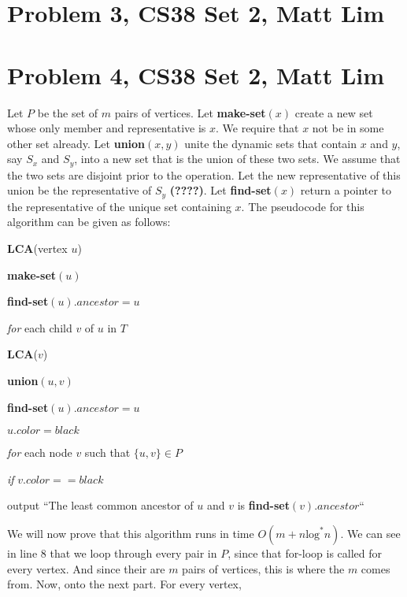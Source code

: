 \documentclass{article}
\begin{document}
\section*{Problem 3, CS38 Set 2, Matt Lim}
\newpage

\section*{Problem 4, CS38 Set 2, Matt Lim}
Let $P$ be the set of $m$ pairs of vertices. Let \textbf{make-set}$(x)$ create
a new set whose only member and representative is $x$. We require that $x$ not
be in some other set already. Let \textbf{union}$(x,y)$ unite the dynamic sets
that contain $x$ and $y$, say $S_x$ and $S_y$, into a new set that is the union
of these two sets. We assume that the two sets are disjoint prior to the
operation. Let the new representative of this union be the representative of
$S_y$ \textbf{(????)}. Let \textbf{find-set}$(x)$ return a pointer to the
representative of the unique set containing $x$.
The pseudocode for this algorithm can be given as follows:
\vspace{5mm}

\noindent \textbf{LCA}(vertex $u$)
\begin{enumerate}
    \item \textbf{make-set}$(u)$
    \item \textbf{find-set}$(u).ancestor = u$
    \item \textit{for} each child $v$ of $u$ in $T$
    {\setlength\itemindent{25pt} \item \textbf{LCA}($v$) }
    {\setlength\itemindent{25pt} \item \textbf{union}$(u,v)$ }
    {\setlength\itemindent{25pt} \item \textbf{find-set}$(u).ancestor = u$ }
    \item $u.color = black$
    \item \textit{for} each node $v$ such that $\{u,v\} \in P$
    {\setlength\itemindent{25pt} \item \textit{if} $v.color == black$ }
    {\setlength\itemindent{50pt} \item output ``The least common ancestor of $u$
        and $v$ is \textbf{find-set}$(v).ancestor$`` }
\end{enumerate}

We will now prove that this algorithm runs in time $O(m + n\text{log}^*n)$.
We can see in line 8 that we loop through every pair in $P$, since that for-loop
is called for every vertex. And since their are $m$ pairs of vertices, this is
where the $m$ comes from. Now, onto the next part. For every vertex,
\newpage
\end{document}
